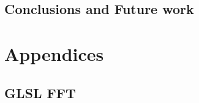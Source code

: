\documentclass[
  oneside,
  11pt, a4paper,
  footinclude=true,
  headinclude=true,
  cleardoublepage=empty
]{scrbook}
\begin{document}
\chapter{Conclusions and Future work}


\cleardoublepage



\printindex

    
    \appendix
    \renewcommand\chaptername{Appendix}



\part{Appendices}

\chapter{GLSL FFT} \label{apdx:ctfft}
\end{document}
